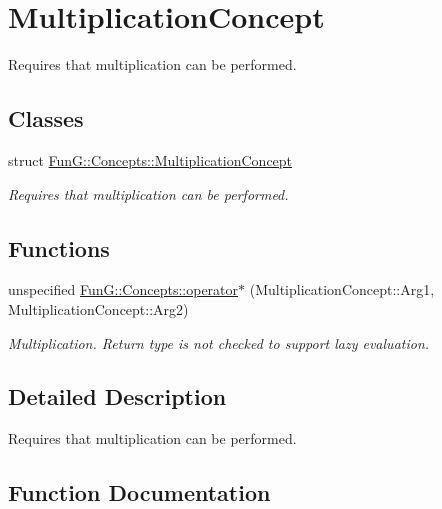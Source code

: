 \hypertarget{group__MultiplicationConcept}{}\section{Multiplication\+Concept}
\label{group__MultiplicationConcept}


Requires that multiplication can be performed.  


\subsection*{Classes}
\begin{DoxyCompactItemize}
\item 
struct \hyperlink{structFunG_1_1Concepts_1_1MultiplicationConcept}{Fun\+G\+::\+Concepts\+::\+Multiplication\+Concept}
\begin{DoxyCompactList}\small\item\em Requires that multiplication can be performed. \end{DoxyCompactList}\end{DoxyCompactItemize}
\subsection*{Functions}
\begin{DoxyCompactItemize}
\item 
unspecified \hyperlink{group__MultiplicationConcept_ga02a0c88d20771819afda900e6bbf16f5}{Fun\+G\+::\+Concepts\+::operator$\ast$} (Multiplication\+Concept\+::\+Arg1, Multiplication\+Concept\+::\+Arg2)
\begin{DoxyCompactList}\small\item\em Multiplication. Return type is not checked to support lazy evaluation. \end{DoxyCompactList}\end{DoxyCompactItemize}


\subsection{Detailed Description}
Requires that multiplication can be performed. 



\subsection{Function Documentation}
\hypertarget{group__MultiplicationConcept_ga02a0c88d20771819afda900e6bbf16f5}{}
